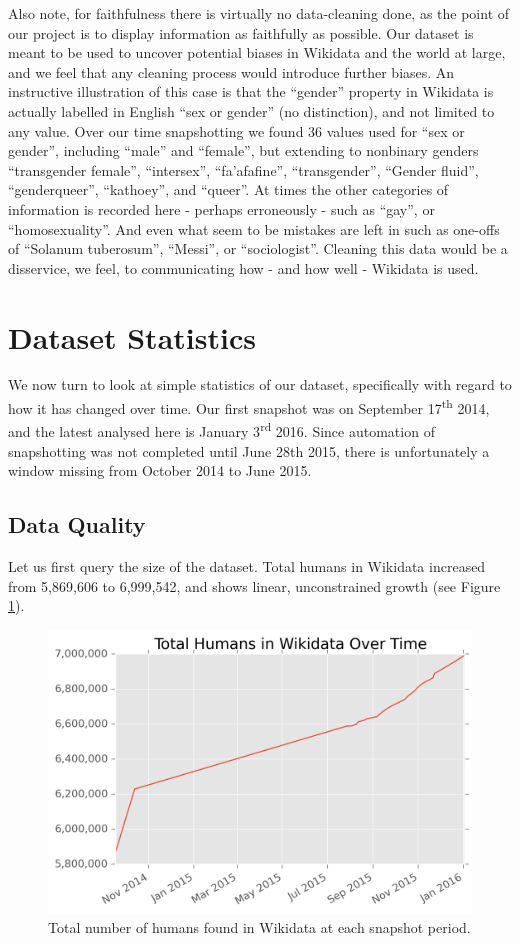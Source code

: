 \documentclass[letterpaper]{article}
\begin{document}
Also note, for faithfulness there is virtually no data-cleaning done, as the point of our project is to display information as faithfully as possible. Our dataset is meant to be used to uncover potential biases in Wikidata and the world at large, and we feel that any cleaning process would introduce further biases. An instructive illustration of this case is that the ``gender'' property in Wikidata is actually labelled in English ``sex or gender'' (no distinction), and not limited to any value. Over our time snapshotting we found 36 values used for ``sex or gender'', including ``male'' and ``female'', but extending to nonbinary genders ``transgender female'', ``intersex'', ``fa'afafine'', ``transgender'', ``Gender fluid'',  ``genderqueer'', ``kathoey'', and ``queer''. At times the other categories of information is recorded here - perhaps erroneously - such as ``gay'', or ``homosexuality''. And even what seem to be mistakes are left in such as one-offs of ``Solanum tuberosum'', ``Messi'', or ``sociologist''. Cleaning this data would be a disservice, we feel, to communicating how - and how well - Wikidata is used.

\section{Dataset Statistics}
We now turn to look at simple statistics of our dataset, specifically with regard to how it has changed over time. Our first snapshot was on September 17\textsuperscript{th} 2014, and the latest analysed here is January 3\textsuperscript{rd} 2016. Since automation of snapshotting was not completed until June 28th 2015, there is unfortunately a window missing from October 2014 to June 2015. 

\subsection{Data Quality}
Let us first query the size of the dataset. Total humans in Wikidata increased from 5,869,606 to 6,999,542, and shows linear, unconstrained growth (see Figure \ref{fig:totalhumans}).

\begin{figure}
\includegraphics[scale=0.6]{figures/totalhumans.png} 
\caption{Total number of humans found in Wikidata at each snapshot period.}
\label{fig:totalhumans}
\end{figure}
\end{document}
